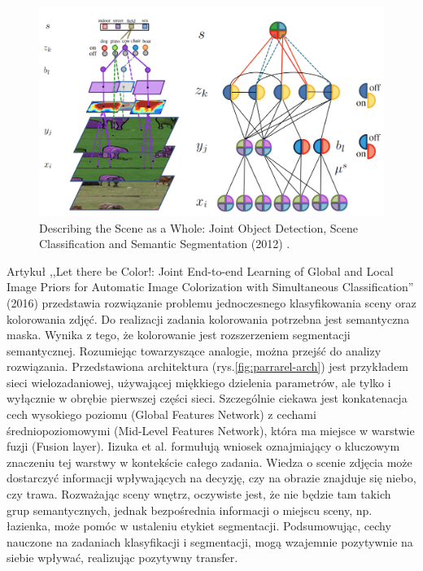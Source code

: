 \begin{figure}[ht!]
    \includegraphics[width=\textwidth]{img/joint-segmentation-and-classification.png}
    \caption{Describing the Scene as a Whole: Joint Object Detection, Scene Classification and Semantic Segmentation (2012) \cite{yao2012describing}.}
    \label{fig:scene-as-a-whole}
\end{figure}
Artykuł ,,Let there be Color!: Joint End-to-end Learning of Global and Local Image Priors for Automatic Image Colorization with Simultaneous Classification'' (2016) \cite{iizuka2016let} przedstawia rozwiązanie problemu jednoczesnego klasyfikowania sceny oraz kolorowania zdjęć. Do realizacji zadania kolorowania potrzebna jest semantyczna maska. Wynika z tego, że kolorowanie jest rozszerzeniem segmentacji semantycznej. Rozumiejąc towarzyszące analogie, można przejść do analizy rozwiązania. Przedstawiona architektura (rys.\ref{fig:parrarel-arch}) jest przykładem sieci wielozadaniowej, używającej miękkiego dzielenia parametrów, ale tylko i wyłącznie w obrębie pierwszej części sieci. Szczególnie ciekawa jest konkatenacja cech wysokiego poziomu (Global Features Network) z cechami średniopoziomowymi (Mid-Level Features Network), która ma miejsce w warstwie fuzji (Fusion layer). Iizuka et al. formułują wniosek oznajmiający o kluczowym znaczeniu tej warstwy w kontekście całego zadania. Wiedza o scenie zdjęcia może dostarczyć informacji wpływających na decyzję, czy na obrazie znajduje się niebo, czy trawa. Rozważając sceny wnętrz, oczywiste jest, że nie będzie tam takich grup semantycznych, jednak bezpośrednia informacji o miejscu sceny, np. łazienka, może pomóc w ustaleniu etykiet segmentacji. Podsumowując, cechy nauczone na zadaniach klasyfikacji i segmentacji, mogą wzajemnie pozytywnie na siebie wpływać, realizując pozytywny transfer.
